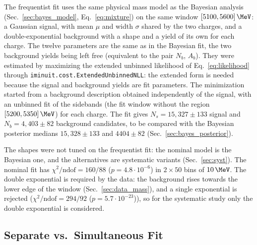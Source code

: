The frequentist fit uses the same physical mass model as the Bayesian analysis (Sec.~\ref{sec:bayes_model}, Eq.~\eqref{eq:mixture}) on the same window $[5100,5600]\,\MeV$: a Gaussian signal, with mean $\mu$ and width $\sigma$ shared by the two charges, and a double-exponential background with a shape and a yield of its own for each charge. The twelve parameters are the same as in the Bayesian fit, the two background yields being left free (equivalent to the pair $N_b$, $A_b$). They were estimated by maximizing the extended unbinned likelihood of Eq.~\eqref{eq:likelihood} through \texttt{iminuit.cost.ExtendedUnbinnedNLL}: the extended form is needed because the signal and background yields are fit parameters. The minimization started from a background description obtained independently of the signal, with an unbinned fit of the sidebands (the fit window without the region $[5200,5350]\,\MeV$) for each charge. The fit gives $N_s=15{,}327\pm133$ signal and $N_b=4{,}403\pm82$ background candidates, to be compared with the Bayesian posterior medians $15{,}328\pm133$ and $4404\pm82$ (Sec.~\ref{sec:bayes_posterior}).

The shapes were not tuned on the frequentist fit: the nominal model is the Bayesian one, and the alternatives are systematic variants (Sec.~\ref{sec:syst}). The nominal fit has $\chi^2/\mathrm{ndof}=160/88$ ($p=4.8\cdot 10^{-6}$) in $2\times50$ bins of $10\,\MeV$.
The double exponential is required by the data: the background rises towards the lower edge of the window (Sec.~\ref{sec:data_mass}), and a single exponential is rejected ($\chi^2/\mathrm{ndof}=294/92$ ($p=5.7\cdot 10^{-23}$)), so for the systematic study only the double exponential is considered.

\subsection{Separate vs.\ Simultaneous Fit}
\label{sec:freq_simfit}

